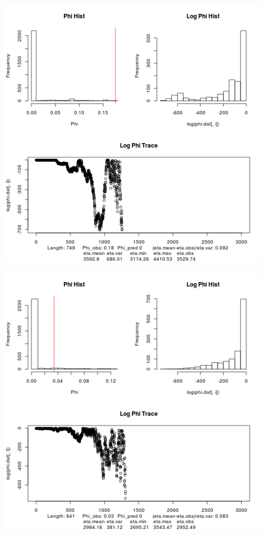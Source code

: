 \documentclass{article}
\begin{document}
 	\includegraphics[scale=0.5]{../chosen_100/3000_steps/BIS10/lnorm_prop/hist/11_phi_hist.png}
 	
 	\includegraphics[scale=0.5]{../chosen_100/3000_steps/BIS10/lnorm_prop/hist/21_phi_hist.png}
 	
\end{document}
